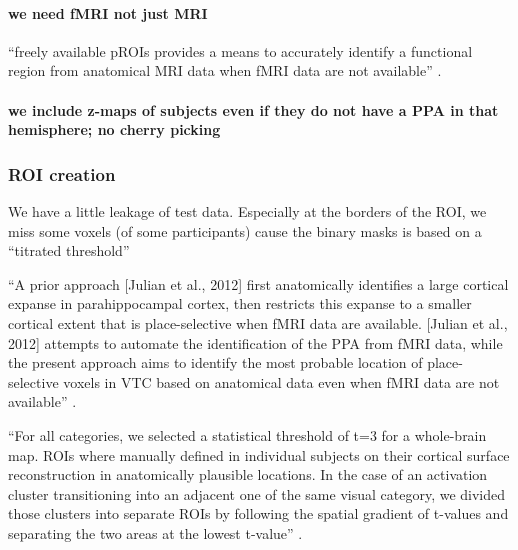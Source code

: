 \paragraph{we need fMRI not just MRI}


``freely available pROIs provides a means to accurately identify a functional
region from anatomical MRI data when fMRI data are not available''
\citep{weiner2018defining}.


\paragraph{we include z-maps of subjects even if they do not have a PPA in that
hemisphere; no cherry picking}


\subsubsection{ROI creation}

We have a little leakage of test data.
%
Especially at the borders of the ROI, we miss some voxels (of some participants)
cause the binary masks is based on a ``titrated threshold''
\citep{sengupta2016extension}




``A prior approach [Julian et al., 2012] first anatomically identifies a large
cortical expanse in parahippocampal cortex, then restricts this expanse to a
smaller cortical extent that is place-selective when fMRI data are available.
%
[Julian et al., 2012] attempts to automate the identification of the PPA from
fMRI data, while the present approach aims to identify the most probable
location of place-selective voxels in VTC based on anatomical data even when
fMRI data are not available'' \citep{weiner2018defining}.

``For all categories, we selected a statistical threshold of t=3 for a
whole-brain map.
%
ROIs where manually defined in individual subjects on their cortical surface
reconstruction in anatomically plausible locations.
%
In the case of an activation cluster transitioning into an adjacent one of the
same visual category, we divided those clusters into separate ROIs by following
the spatial gradient of t-values and separating the two areas at the lowest
t-value'' \citep{rosenke2021probabilistic}.

